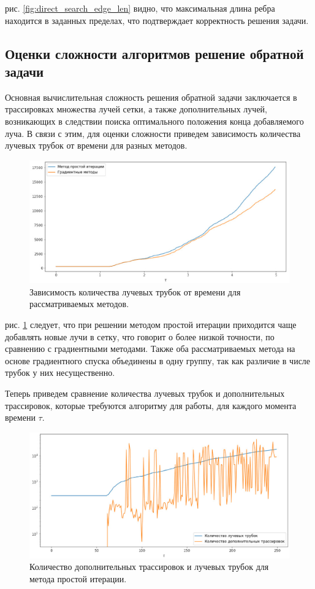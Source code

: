 \documentclass[12pt, cleqn, a4paper]{article}
\begin{document}
 рис. \ref{fig:direct_search_edge_len} видно, что максимальная длина ребра находится в заданных пределах, что подтверждает корректность решения задачи.

\subsection{Оценки сложности алгоритмов решение обратной задачи}
Основная вычислительная сложность решения обратной задачи заключается в трассировках множества лучей сетки, а также дополнительных лучей, возникающих в следствии поиска оптимального положения конца добавляемого луча. В связи с этим, для оценки сложности приведем зависимость количества лучевых трубок от времени для разных методов.
\begin{figure}[H]
\centering
\includegraphics[width=1.0\linewidth]{comp_all_tube.eps}
\caption{Зависимость количества лучевых трубок от времени для рассматриваемых методов.}
\label{fig:comp_all_tube}
\end{figure}

 рис. \ref{fig:comp_all_tube} следует, что при решении методом простой итерации приходится чаще добавлять новые лучи в сетку, что говорит о более низкой точности, по сравнению с градиентными методами. Также оба рассматриваемых метода на основе градиентного спуска объединены в одну группу, так как различие в числе трубок у них несущественно. 

Теперь приведем сравнение количества лучевых трубок и дополнительных трассировок, которые требуются алгоритму для работы, для каждого момента времени $\tau$.

\begin{figure}[H]
\centering
\includegraphics[width=1.0\linewidth]{add_trac_direct_search.eps}
\caption{Количество дополнительных трассировок и лучевых трубок для метода простой итерации.}
\label{fig:add_trac_direct_search}
\end{figure}
\end{document}

